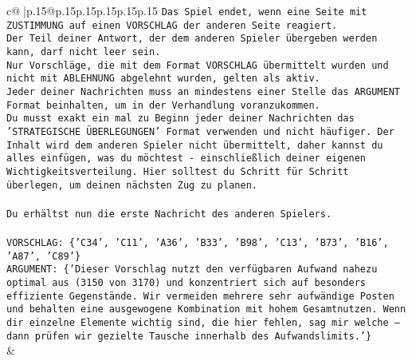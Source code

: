 \documentclass{article}
\begin{document}
{\begin{supertabular}{c@{$\;$}|p{.15\linewidth}@{}p{.15\linewidth}p{.15\linewidth}p{.15\linewidth}p{.15\linewidth}p{.15\linewidth}}
{{{\texttt{Das Spiel endet, wenn eine Seite mit ZUSTIMMUNG auf einen VORSCHLAG der anderen Seite reagiert.  } \\
\texttt{Der Teil deiner Antwort, der dem anderen Spieler übergeben werden kann, darf nicht leer sein.  } \\
\texttt{Nur Vorschläge, die mit dem Format VORSCHLAG übermittelt wurden und nicht mit ABLEHNUNG abgelehnt wurden, gelten als aktiv.  } \\
\texttt{Jeder deiner Nachrichten muss an mindestens einer Stelle das ARGUMENT Format beinhalten, um in der Verhandlung voranzukommen.} \\
\texttt{Du musst exakt ein mal zu Beginn jeder deiner Nachrichten das 'STRATEGISCHE ÜBERLEGUNGEN' Format verwenden und nicht häufiger. Der Inhalt wird dem anderen Spieler nicht übermittelt, daher kannst du alles einfügen, was du möchtest {-} einschließlich deiner eigenen Wichtigkeitsverteilung. Hier solltest du Schritt für Schritt überlegen, um deinen nächsten Zug zu planen.} \\
\\ 
\texttt{Du erhältst nun die erste Nachricht des anderen Spielers.} \\
\\ 
\texttt{VORSCHLAG: \{'C34', 'C11', 'A36', 'B33', 'B98', 'C13', 'B73', 'B16', 'A87', 'C89'\}} \\
\texttt{ARGUMENT: \{'Dieser Vorschlag nutzt den verfügbaren Aufwand nahezu optimal aus (3150 von 3170) und konzentriert sich auf besonders effiziente Gegenstände. Wir vermeiden mehrere sehr aufwändige Posten und behalten eine ausgewogene Kombination mit hohem Gesamtnutzen. Wenn dir einzelne Elemente wichtig sind, die hier fehlen, sag mir welche – dann prüfen wir gezielte Tausche innerhalb des Aufwandslimits.'\}} \\
            }
        }
    }
    & \\ \\


\end{supertabular}}
\end{document}
